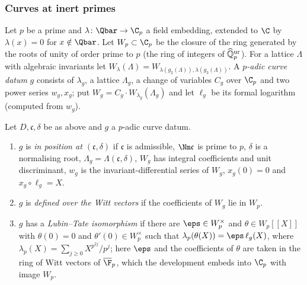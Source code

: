 \subsubsection{Curves at inert primes}
Let $p$ be a prime and $\lambda\colon\Qbar\to\C_p$ a field embedding, extended to $\C$ by $\lambda(x)=0$ for
$x\notin\Qbar$. Let $W_p\subset\C_p$ be the closure of the ring generated by the roots of unity of order prime to
$p$ (the ring of integers of $\widehat{\mathbb{Q}}{}_p^{\mathrm{ur}}$). For a lattice $\Lambda$ with algebraic invariants let
$W_\lambda(\Lambda)=W_{\lambda(g_2(\Lambda)),\lambda(g_3(\Lambda))}$. A \emph{$p$-adic curve datum} $g$ consists of
$\lambda_g$, a lattice $\Lambda_g$, a change of variables $C_g$ over $\C_p$ and two power series $w_g,x_g$; put
$W_g=C_g\cdot W_{\lambda_g}(\Lambda_g)$ and let $\ell_g$ be its formal logarithm (computed from $w_g$).

\begin{definition}\label{pf:reckernel:def-position}
Let $D,\mathfrak c,\delta$ be as above and $g$ a $p$-adic curve datum.
\begin{enumerate}
\item $g$ is \emph{in position at $(\mathfrak c,\delta)$} if $\mathfrak c$ is admissible, $\Nm\mathfrak c$ is prime to
  $p$, $\delta$ is a normalising root, $\Lambda_g=\Lambda(\mathfrak c,\delta)$, $W_g$ has integral coefficients and
  unit discriminant, $w_g$ is the invariant-differential series of $W_g$, $x_g(0)=0$ and $x_g\circ\ell_g=X$.
\item $g$ is \emph{defined over the Witt vectors} if the coefficients of $W_g$ lie in $W_p$.
\item $g$ has a \emph{Lubin--Tate isomorphism} if there are $\eps\in W_p^\times$ and $\theta\in W_p[[X]]$ with
  $\theta(0)=0$ and $\theta'(0)\in W_p^\times$ such that $\lambda_p(\theta(X))=\eps\,\ell_g(X)$, where
  $\lambda_p(X)=\sum_{j\ge0}X^{p^{2j}}/p^j$; here $\eps$ and the coefficients of $\theta$ are taken in the ring of
  Witt vectors of $\overline{\F}_p$, which the development embeds into $\C_p$ with image $W_p$.
\end{enumerate}
\end{definition}

